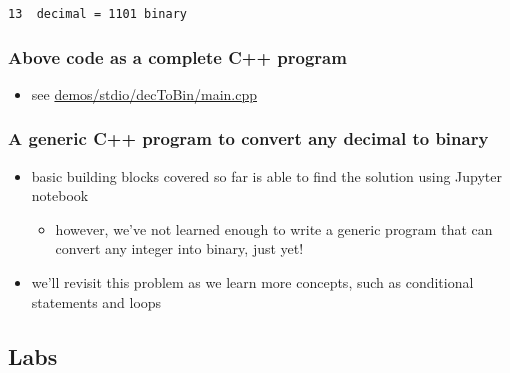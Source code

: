 \documentclass[11pt]{article}
\providecommand{\tightlist}{%
      \setlength{\itemsep}{0pt}\setlength{\parskip}{0pt}}
\begin{document}
    \begin{Verbatim}[commandchars=\\\{\}]
13  decimal = 1101 binary
    \end{Verbatim}

    \hypertarget{above-code-as-a-complete-c-program}{%
\subsubsection{Above code as a complete C++
program}\label{above-code-as-a-complete-c-program}}

\begin{itemize}
\tightlist
\item
  see \url{demos/stdio/decToBin/main.cpp}
\end{itemize}

\hypertarget{a-generic-c-program-to-convert-any-decimal-to-binary}{%
\subsubsection{A generic C++ program to convert any decimal to
binary}\label{a-generic-c-program-to-convert-any-decimal-to-binary}}

\begin{itemize}
\tightlist
\item
  basic building blocks covered so far is able to find the solution
  using Jupyter notebook

  \begin{itemize}
  \tightlist
  \item
    however, we've not learned enough to write a generic program that
    can convert any integer into binary, just yet!
  \end{itemize}
\item
  we'll revisit this problem as we learn more concepts, such as
  conditional statements and loops
\end{itemize}

    \hypertarget{labs}{%
\subsection{Labs}\label{labs}}
\end{document}
